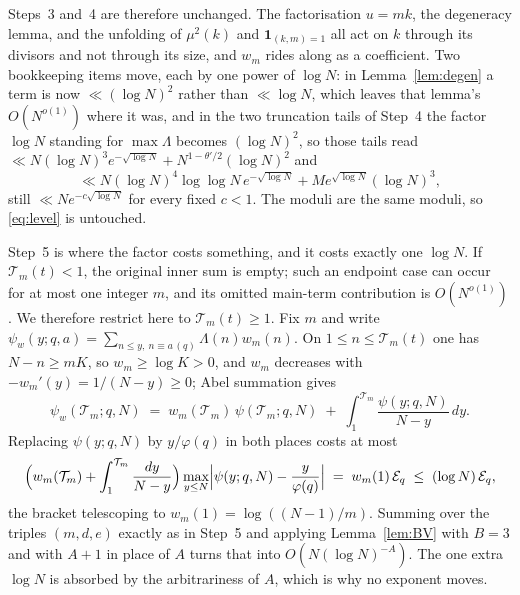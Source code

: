 \documentclass[11pt,a4paper]{article}
\theoremstyle{plain}
\theoremstyle{definition}
\theoremstyle{remark}
\newcommand{\Tcut}{\mathcal T}
\begin{document}
Steps~3 and~4 are therefore unchanged. The factorisation $u=mk$, the
degeneracy lemma, and the unfolding of $\mu^2(k)$ and
$\mathbf 1_{(k,m)=1}$ all act on $k$ through its divisors and not
through its size, and $w_m$ rides along as a coefficient. Two
bookkeeping items move, each by one power of $\log N$: in
Lemma~\ref{lem:degen} a term is now $\ll(\log N)^2$ rather than
$\ll\log N$, which leaves that lemma's $O(N^{o(1)})$ where it was, and
in the two truncation tails of Step~4 the factor $\log N$ standing for
$\max\Lambda$ becomes $(\log N)^2$, so those tails read
$\ll N(\log N)^{3}e^{-\sqrt{\log N}}+N^{1-\theta'/2}(\log N)^2$ and
\[
 \ll N(\log N)^4\log\log N\,e^{-\sqrt{\log N}}
      +M e^{\sqrt{\log N}}(\log N)^3,
\]
still $\ll Ne^{-c\sqrt{\log N}}$ for every fixed $c<1$. The moduli are the same
moduli, so \eqref{eq:level} is untouched.

Step~5 is where the factor costs something, and it costs exactly one
$\log N$.  If $\Tcut_m(t)<1$, the original inner sum is empty; such an
endpoint case can occur for at most one integer $m$, and its omitted
main-term contribution is $O(N^{o(1)})$.  We therefore restrict here to
$\Tcut_m(t)\ge1$. Fix $m$ and write
$\psi_w(y;q,a)=\sum_{n\le y,\ n\equiv a\,(q)}\Lambda(n)w_m(n)$. On
$1\le n\le\Tcut_m(t)$ one has $N-n\ge mK$, so $w_m\ge\log K>0$, and
$w_m$ decreases with $-w_m'(y)=1/(N-y)\ge0$; Abel summation gives
\[
  \psi_w(\Tcut_m;q,N)
   \;=\;w_m(\Tcut_m)\,\psi(\Tcut_m;q,N)
     \;+\;\int_{1}^{\Tcut_m}\frac{\psi(y;q,N)}{N-y}\,dy .
\]
Replacing $\psi(y;q,N)$ by $y/\varphi(q)$ in both places costs at most
\[
  \Bigl(w_m(\Tcut_m)+\int_{1}^{\Tcut_m}\frac{dy}{N-y}\Bigr)
  \max_{y\le N}\Bigl|\psi(y;q,N)-\frac{y}{\varphi(q)}\Bigr|
  \;=\;w_m(1)\,\mathcal E_q\;\le\;(\log N)\,\mathcal E_q,
\]
the bracket telescoping to $w_m(1)=\log((N-1)/m)$. Summing over the
triples $(m,d,e)$ exactly as in Step~5 and applying
Lemma~\ref{lem:BV} with $B=3$ and with $A+1$ in place of $A$ turns
that into $O(N(\log N)^{-A})$. The one extra $\log N$ is absorbed by
the arbitrariness of $A$, which is why no exponent moves.
\end{document}
